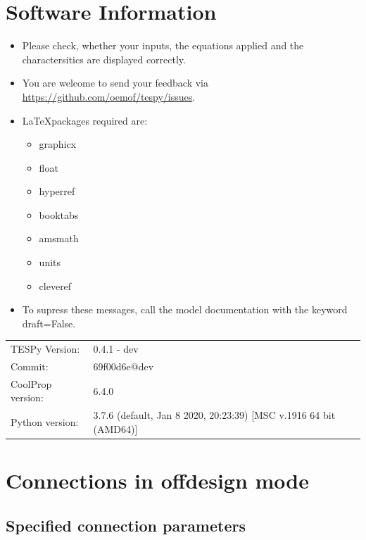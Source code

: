 \section*{Software Information}

\begin{itemize}
\item Please check, whether your inputs, the equations applied and the charactersitics are displayed correctly.
\item You are welcome to send your feedback via \url{https://github.com/oemof/tespy/issues}.
\item \LaTeX packages required are:
\begin{itemize}
\item graphicx
\item float
\item hyperref
\item booktabs
\item amsmath
\item units
\item cleveref
\end{itemize}
\item To supress these messages, call the model documentation with the keyword draft=False.
\end{itemize}

\begin{table}[H]
\begin{tabular}{ll}
TESPy Version:&0.4.1 - dev\\
Commit:&69f00d6e@dev\\
CoolProp version:&6.4.0\\
Python version:&3.7.6 (default, Jan  8 2020, 20:23:39) [MSC v.1916 64 bit (AMD64)]\\
\end{tabular}
\end{table}
\newpage\section{Connections in offdesign mode}

\subsection{Specified connection parameters}

